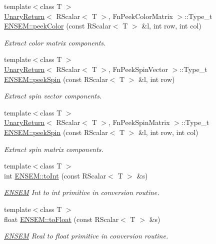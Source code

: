 \begin{DoxyCompactItemize}
{\footnotesize template$<$class T $>$ }\\\mbox{\hyperlink{structUnaryReturn}{Unary\+Return}}$<$ R\+Scalar$<$ T $>$, Fn\+Peek\+Color\+Matrix $>$\+::Type\+\_\+t \mbox{\hyperlink{group__rscalar_ga692303fb1e668f95b9363df896b04842}{E\+N\+S\+E\+M\+::peek\+Color}} (const R\+Scalar$<$ T $>$ \&l, int row, int col)
\begin{DoxyCompactList}\small\item\em Extract color matrix components. \end{DoxyCompactList}\item 
{\footnotesize template$<$class T $>$ }\\\mbox{\hyperlink{structUnaryReturn}{Unary\+Return}}$<$ R\+Scalar$<$ T $>$, Fn\+Peek\+Spin\+Vector $>$\+::Type\+\_\+t \mbox{\hyperlink{group__rscalar_gae91157ec10379f83a648e992a01ce0c6}{E\+N\+S\+E\+M\+::peek\+Spin}} (const R\+Scalar$<$ T $>$ \&l, int row)
\begin{DoxyCompactList}\small\item\em Extract spin vector components. \end{DoxyCompactList}\item 
{\footnotesize template$<$class T $>$ }\\\mbox{\hyperlink{structUnaryReturn}{Unary\+Return}}$<$ R\+Scalar$<$ T $>$, Fn\+Peek\+Spin\+Matrix $>$\+::Type\+\_\+t \mbox{\hyperlink{group__rscalar_gafc1d2e7916b4f394f3c5aa75ce62b421}{E\+N\+S\+E\+M\+::peek\+Spin}} (const R\+Scalar$<$ T $>$ \&l, int row, int col)
\begin{DoxyCompactList}\small\item\em Extract spin matrix components. \end{DoxyCompactList}\item 
{\footnotesize template$<$class T $>$ }\\int \mbox{\hyperlink{group__rscalar_ga7507e0e1da7cf75743141d70fd7150c8}{E\+N\+S\+E\+M\+::to\+Int}} (const R\+Scalar$<$ T $>$ \&s)
\begin{DoxyCompactList}\small\item\em \mbox{\hyperlink{namespaceENSEM}{E\+N\+S\+EM}} Int to int primitive in conversion routine. \end{DoxyCompactList}\item 
{\footnotesize template$<$class T $>$ }\\float \mbox{\hyperlink{group__rscalar_gad6e25c9e461f462a45e20d34e29165c9}{E\+N\+S\+E\+M\+::to\+Float}} (const R\+Scalar$<$ T $>$ \&s)
\begin{DoxyCompactList}\small\item\em \mbox{\hyperlink{namespaceENSEM}{E\+N\+S\+EM}} Real to float primitive in conversion routine. \end{DoxyCompactList}\item 

\end{DoxyCompactItemize}
